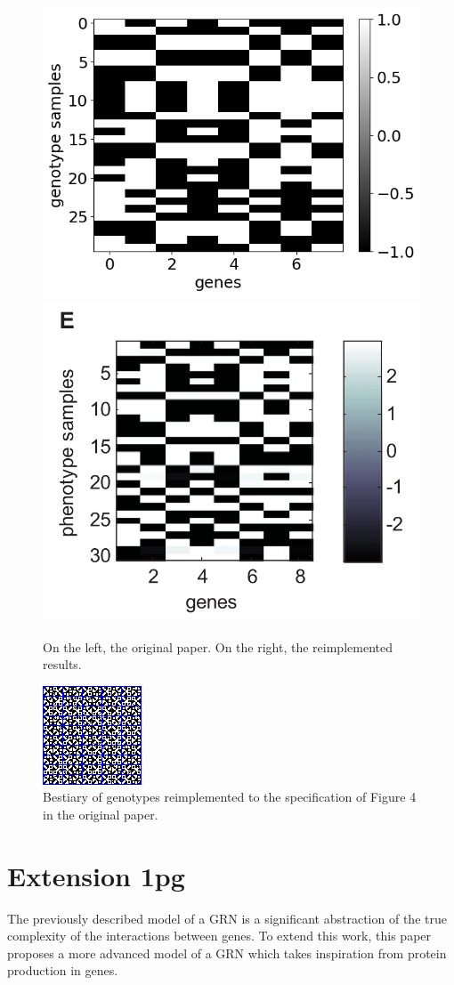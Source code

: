 \documentclass[twocolumn,a4paper,12pt]{article}
\begin{document}
    \begin{figure}[h]
        \centering
        \includegraphics[width=0.45\linewidth]{img/fig2e.png}
        \includegraphics[width=0.45\linewidth]{orig_img/fig2e.png}
        \caption{On the left, the original paper. On the right, the reimplemented results.} \label{fig:2e}
    \end{figure}

    \begin{figure}[h]
        \centering
        \includegraphics[width=0.45\linewidth]{img/fig4b.png}
        \caption{Bestiary of genotypes reimplemented to the specification of Figure 4 in the original paper.} \label{fig:4b}
    \end{figure}

    \section{Extension 1pg}
    The previously described model of a GRN is a significant abstraction of the true complexity of the interactions between genes. To extend this work, this paper proposes a more advanced model of a GRN which takes inspiration from protein production in genes.
\end{document}
